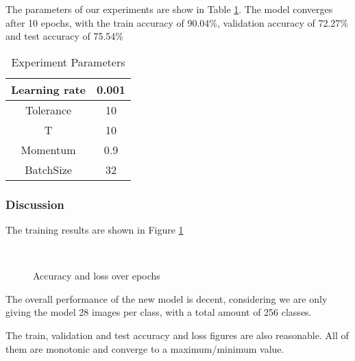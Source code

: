 The parameters of our experiments are show in Table \ref{tab-trans1}. The model converges after 10 epochs, with the train accuracy of 90.04\%, validation accuracy of 72.27\% and test accuracy of 75.54\%

\begin{table}[H]
	\caption{Experiment Parameters}
	\centering
	\begin{tabular}{cc}
		\toprule
		\cmidrule{1-2}
		Learning rate & 0.001\\
		\midrule
		Tolerance & 10\\
		\midrule
		T & 10\\
		\midrule
		Momentum & 0.9\\
		\midrule
		BatchSize & 32\\
		\bottomrule
	\end{tabular}
	\label{tab-trans1}
\end{table}

\subsubsection{Discussion}
The training results are shown in Figure \ref{fig-trans1}

\begin{figure}[H]
\centering
{}%
\\%
\caption{Accuracy and loss over epochs}
\label{fig-trans1}
\end{figure}



The overall performance of the new model is decent, considering we are only giving the model 28 images per class, with a total amount of 256 classes. 

The train, validation and test accuracy and loss figures are also reasonable. All of them are monotonic and converge to a maximum/minimum value. 

